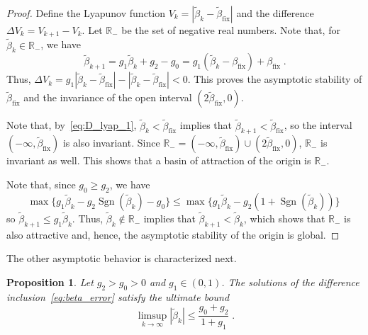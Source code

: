 \documentclass{article}
\newcommand{\RR}{\mathbb{R}}
\newcommand{\fix}{\mathrm{fix}}
\DeclareMathOperator{\sgn}{Sgn}
\newtheorem{proposition}{Proposition}
\theoremstyle{definition}
\theoremstyle{remark}
\begin{document}
\begin{proof}
    Define the Lyapunov function $V_k = |\tilde{\beta}_k - \tilde{\beta}_\fix|$ and the difference $\Delta V_k =  V_{k+1} - V_k$. Let $\RR_{-}$ be the set of negative real numbers. Note that, for $\tilde{\beta}_k \in \RR_{-}$, we have
    \begin{equation} \label{eq:D_lyap_1}
        \tilde{\beta}_{k+1} = g_1 \tilde{\beta}_k + g_2 - g_0 = g_1 (\tilde{\beta}_k - \beta_\fix) + \beta_\fix \;.
    \end{equation}
    Thus, $\Delta V_k = g_1 |\tilde{\beta}_k - \tilde{\beta}_\fix| - |\tilde{\beta}_k - \tilde{\beta}_\fix| < 0$. This proves the asymptotic stability of $\tilde{\beta}_\fix$ and the invariance of the open interval $(2\tilde{\beta}_\fix,0)$.

    Note that, by~\eqref{eq:D_lyap_1}, $\tilde{\beta}_k < \tilde{\beta}_\fix$ implies that $\tilde{\beta}_{k+1} < \tilde{\beta}_\fix$, so the interval $(-\infty,\tilde{\beta}_\fix)$ is also invariant. Since $\RR_- = (-\infty,\tilde{\beta}_\fix)\cup (2\tilde{\beta}_\fix,0)$, $\RR_-$ is invariant as well. This shows that a basin of attraction of the origin is $\RR_-$.

    Note that, since $g_0 \ge g_2$, we have
    \begin{displaymath}
        \max\{g_1 \tilde{\beta}_k - g_2\sgn(\tilde{\beta}_k) - g_0\} \le \max\{g_1 \tilde{\beta}_k - g_2(1 + \sgn(\tilde{\beta}_k))\} \;
    \end{displaymath}
    so $\tilde{\beta}_{k+1} \le g_1 \tilde{\beta}_k$. Thus, $\tilde{\beta}_{k} \not\in \RR_-$ implies that $\tilde{\beta}_{k+1} < \tilde{\beta}_{k}$, which shows that $\RR_-$ is also attractive and, hence, the asymptotic stability of the origin is global.
\end{proof}

The other asymptotic behavior is characterized next.

\begin{proposition} \label{prop:behav_2}
    Let $g_2 > g_0 > 0$ and $g_1 \in (0,1)$. The solutions of the difference inclusion~\eqref{eq:beta_error} satisfy the ultimate bound
    \begin{displaymath}
        \limsup_{k \to \infty} |\tilde{\beta}_k| \le \frac{g_0+g_2}{1+g_1} \;.
    \end{displaymath}
\end{proposition}
\end{document}
